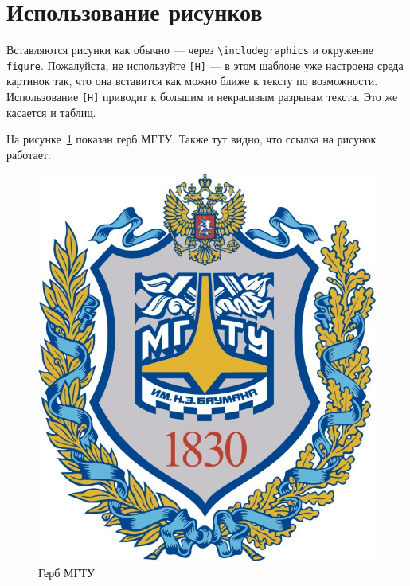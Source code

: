 \section{Использование рисунков}

Вставляются рисунки как обычно --- через \texttt{\textbackslash includegraphics} и окружение \texttt{figure}. Пожалуйста, не используйте \texttt{[H]} --- в этом шаблоне уже настроена среда картинок так, что она вставится как можно ближе к тексту по возможности. Использование \texttt{[H]} приводит к большим и некрасивым разрывам текста. Это же касается и таблиц.

На рисунке~\ref{fig:fig01} показан герб МГТУ. Также тут видно, что ссылка на рисунок работает.

\begin{figure}
  \centering
  \includegraphics[scale=0.7]{inc/bmstu}
  \caption{Герб МГТУ}
  \label{fig:fig01}
\end{figure}




